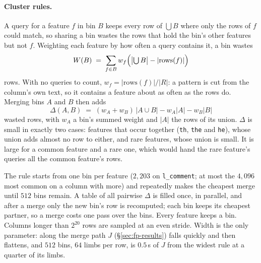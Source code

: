 \paragraph{Cluster rules.}
\label{sec:fp-cluster}
A query for a feature $f$ in bin $B$ keeps every row of $\bigcup B$
where only the rows of $f$ could match, so sharing a bin wastes the rows
that hold the bin's other features but not $f$. Weighting each feature by
how often a query contains it, a bin wastes
\[
  W(B) \;=\; \sum_{f \in B} w_f \Bigl(\bigl|\textstyle\bigcup B\bigr| - |\mathrm{rows}(f)|\Bigr)
\]
rows. With no queries to count, $w_f = |\mathrm{rows}(f)| / |R|$: a
pattern is cut from the column's own text, so it contains a feature about
as often as the rows do. Merging bins $A$ and $B$ then adds
\[
  \Delta(A, B) \;=\; (w_A + w_B)\,|A \cup B| - w_A |A| - w_B |B|
\]
wasted rows, with $w_A$ a bin's summed weight and $|A|$ the rows of its
union. $\Delta$ is small in exactly two cases: features that occur
together (\texttt{th}, \texttt{the} and \texttt{he}), whose union adds
almost no row to either, and rare features, whose union is small. It is
large for a common feature and a rare one, which would hand the rare
feature's queries all the common feature's rows.

The rule starts from one bin per feature ($2{,}203$ on
\texttt{l\_comment}; at most the $4{,}096$ most common on a column with
more) and repeatedly makes the cheapest merge until $512$ bins remain. A
table of all pairwise $\Delta$ is filled once, in parallel, and after a
merge only the new bin's row is recomputed; each bin keeps its cheapest
partner, so a merge costs one pass over the bins. Every feature keeps a
bin. Columns longer than $2^{20}$ rows are sampled at an even stride.
Width is the only parameter: along the merge path $J$
(\S\ref{sec:fp-results}) falls quickly and then flattens, and $512$ bins,
$64$ limbs per row, is $0.5$\,s of $J$ from the widest rule at a quarter
of its limbs.

